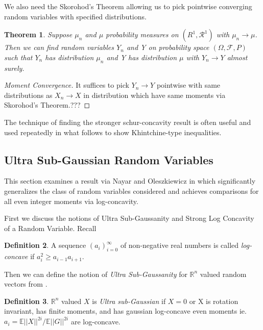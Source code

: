 \documentclass[10pt]{article}
\newcommand{\E}{\mathbb{E}}
\newcommand{\1}{\textbf{1}}
\newcommand{\R}{\mathbb{R}}
\newcommand{\norm}[1]{||#1||}
\newtheorem{theorem}{Theorem}
\theoremstyle{remark}
\theoremstyle{definition}
\newtheorem{defn}[theorem]{Definition}
\begin{document}
We also need the Skorohod's Theorem allowing us to pick pointwise converging random variables with specified distributions.

\begin{theorem}
	Suppose $\mu_n$ and $\mu$ probability measures on $(R^1,\mathcal{R}^1)$ with $\mu_n \to \mu$. Then we can find random variables $Y_n$ and Y on probability space $(\Omega,\mathcal{F},P)$ such that $Y_n$ has distribution $\mu_n$ and Y has distribution $\mu$ with $Y_n \to Y$ almost surely.
\end{theorem}

\begin{proof}[Moment Convergence]
	It suffices to pick $Y_n \to Y$ pointwise with same distributions as $X_n \to X$ in distribution which have same moments via Skorohod's Theorem.???
\end{proof}




The technique of finding the stronger schur-concavity result is often useful and used repeatedly in what follows to show Khintchine-type inequalities.



\subsection{Ultra Sub-Gaussian Random Variables}

This section examines a result via Nayar and Oleszkiewicz in \cite{NO} which significantly generalizes the class of random variables considered and achieves comparisons for all even integer moments via log-concavity.

First we discuss the notions of Ultra Sub-Gaussanity and Strong Log Concavity of a Random Variable. Recall

\begin{defn}
	A sequence $(a_i)_{i=0}^{\infty}$ of non-negative real numbers is called \textit{log-concave} if $a_i^2 \geq a_{i-1}a_{i+1}$.
\end{defn}

Then we can define the notion of \textit{Ultra Sub-Gaussanity} for $\R^n$ valued random vectors from \cite{NO}.

\begin{defn}
	$\R^n$ valued $X$ is \textit{Ultra sub-Gaussian} if $X=0$ or X is rotation invariant, has finite moments, and has gaussian log-concave even moments ie. $a_i = \E \norm{X}^{2i}/\E \norm{G}^{2i}$ are log-concave.
\end{defn}
\end{document}
